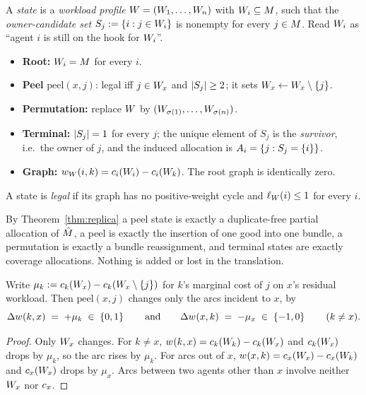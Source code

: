 \begin{definition}
\label{def:peel}
A \emph{state} is a \emph{workload profile} $W = (W_1,
\dots, W_n)$ with $W_i \subseteq M$, such that the
\emph{owner-candidate set} $S_j := \left\{i : j \in W_i\right\}$ is nonempty
for every $j \in M$. Read $W_i$ as ``agent $i$ is still on the
hook for $W_i$''.
\begin{itemize}
  \item \textbf{Root:} $W_i = M$ for every $i$.
  \item \textbf{Peel} $\mathrm{peel}(x,j)$: legal iff $j \in W_x$ and
    $\left\lvert S_j\right\rvert \ge 2$; it sets $W_x \leftarrow W_x
    \setminus \left\{j\right\}$.
  \item \textbf{Permutation:} replace $W$ by $(W_{\sigma(1)},
    \dots, W_{\sigma(n)})$.
  \item \textbf{Terminal:} $\left\lvert S_j\right\rvert = 1$ for every $j$; the unique element of
    $S_j$ is the \emph{survivor}, i.e.\ the owner of $j$, and the induced
    allocation is $A_{i} = \left\{j : S_j = \left\{i\right\}\right\}$.
  \item \textbf{Graph:} $w_{W}(i,k) = c_i(W_i) -
    c_i(W_k)$. The root graph is identically zero.
\end{itemize}
A state is \emph{legal} if its graph has no positive-weight cycle and
$\ell_{W}(i) \le 1$ for every $i$.
\end{definition}

By Theorem~\ref{thm:replica} a peel state is exactly a duplicate-free partial
allocation of $\hat{M}$, a peel is exactly the insertion of one good into
one bundle, a permutation is exactly a bundle reassignment, and terminal states
are exactly coverage allocations. Nothing is added or lost in the translation.

\begin{lemma}
\label{lem:peel}
Write $\mu_k := c_k(W_x) - c_k(W_x \setminus
\left\{j\right\})$ for $k$'s marginal cost of $j$ on $x$'s residual workload. Then
$\mathrm{peel}(x,j)$ changes only the arcs incident to $x$, by
\[
  \Delta w_{}(k,x) \;=\; +\mu_k \;\in\; \left\{0,1\right\}
  \qquad\text{and}\qquad
  \Delta w_{}(x,k) \;=\; -\mu_x \;\in\; \left\{-1,0\right\}
  \qquad (k \ne x).
\]
\end{lemma}

\begin{proof}
Only $W_x$ changes. For $k \ne x$, $w_{}(k,x) =
c_k(W_k) - c_k(W_x)$ and $c_k(W_x)$
drops by $\mu_k$, so the arc rises by $\mu_k$. For arcs out of $x$,
$w_{}(x,k) = c_x(W_x) - c_x(W_k)$ and
$c_x(W_x)$ drops by $\mu_x$. Arcs between two agents other than
$x$ involve neither $W_x$ nor $c_x$.
\end{proof}

